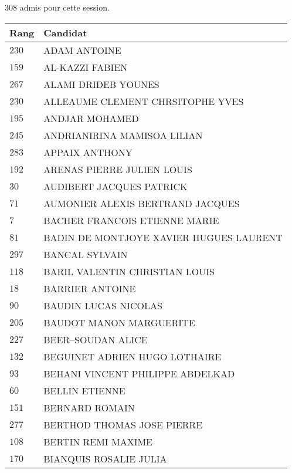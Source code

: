




  $308$ admis pour cette session.

  \begin{xltabular}{\linewidth}{|l|X|}
    \hline
    \textbf{Rang} & \textbf{Candidat} \\
    \hline
    $230$ & ADAM ANTOINE \\
    \hline
    $159$ & AL-KAZZI FABIEN \\
    \hline
    $267$ & ALAMI DRIDEB YOUNES \\
    \hline
    $230$ & ALLEAUME CLEMENT CHRSITOPHE YVES \\
    \hline
    $195$ & ANDJAR MOHAMED \\
    \hline
    $245$ & ANDRIANIRINA MAMISOA LILIAN \\
    \hline
    $283$ & APPAIX ANTHONY \\
    \hline
    $192$ & ARENAS PIERRE JULIEN LOUIS \\
    \hline
    $30$ & AUDIBERT JACQUES PATRICK \\
    \hline
    $71$ & AUMONIER ALEXIS BERTRAND JACQUES \\
    \hline
    $7$ & BACHER FRANCOIS ETIENNE MARIE \\
    \hline
    $81$ & BADIN DE MONTJOYE XAVIER HUGUES LAURENT \\
    \hline
    $297$ & BANCAL SYLVAIN \\
    \hline
    $118$ & BARIL VALENTIN CHRISTIAN LOUIS \\
    \hline
    $18$ & BARRIER ANTOINE \\
    \hline
    $90$ & BAUDIN LUCAS NICOLAS \\
    \hline
    $205$ & BAUDOT MANON MARGUERITE \\
    \hline
    $227$ & BEER--SOUDAN ALICE \\
    \hline
    $132$ & BEGUINET ADRIEN HUGO LOTHAIRE \\
    \hline
    $93$ & BEHANI VINCENT PHILIPPE ABDELKAD \\
    \hline
    $60$ & BELLIN ETIENNE \\
    \hline
    $151$ & BERNARD ROMAIN \\
    \hline
    $277$ & BERTHOD THOMAS JOSE PIERRE \\
    \hline
    $108$ & BERTIN REMI MAXIME \\
    \hline
    $170$ & BIANQUIS ROSALIE JULIA \\

\end{xltabular}
